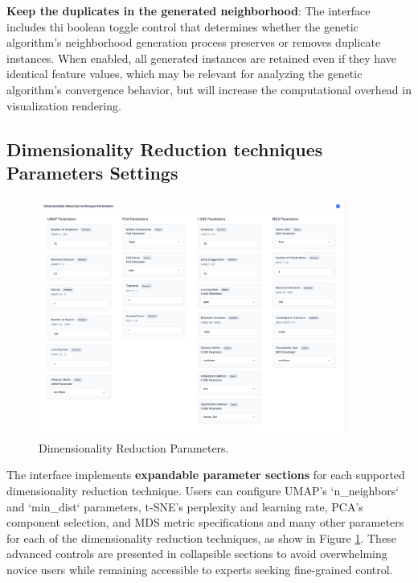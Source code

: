 \textbf{Keep the duplicates in the generated neighborhood}: The interface includes thi boolean toggle control that determines whether the genetic algorithm's neighborhood generation process preserves or removes duplicate instances. When enabled, all generated instances are retained even if they have identical feature values, which may be relevant for analyzing the genetic algorithm's convergence behavior, but will increase the computational overhead in visualization rendering. 

\subsection{Dimensionality Reduction techniques Parameters Settings}

\begin{figure}[htbp]
  \centering
  \includegraphics[width=0.9\textwidth]{images/Dimensionality Reduction Parameters.png}
  \caption{Dimensionality Reduction Parameters.}
  \label{fig:Dimensionality Reduction Parameters}
\end{figure}

The interface implements \textbf{expandable parameter sections} for each supported dimensionality reduction technique. Users can configure UMAP's `n\_neighbors` and `min\_dist` parameters, t-SNE's perplexity and learning rate, PCA's component selection, and MDS metric specifications and many other parameters for each of the dimensionality reduction techniques, as show in Figure \ref{fig:Dimensionality Reduction Parameters}. These advanced controls are presented in collapsible sections to avoid overwhelming novice users while remaining accessible to experts seeking fine-grained control.

